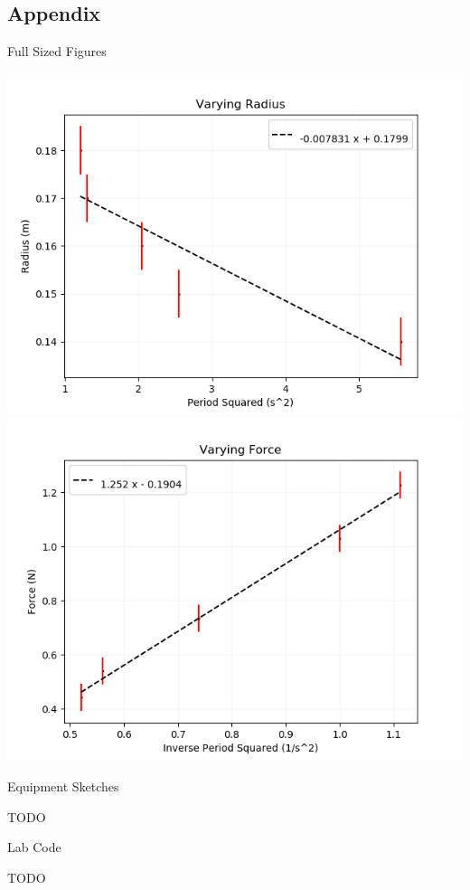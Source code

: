 \documentclass[12pt]{report}
\begin{document}
\begin{flushleft}
\section{Appendix}
\begin{large}
Full Sized Figures \\
\end{large}
\includegraphics{VaryingRadius}
\includegraphics{VaryingForce}
\begin{large}
Equipment Sketches \\
\end{large}
TODO \\
\begin{large}
Lab Code \\
\end{large}
TODO \\



\end{flushleft}
\end{document}
